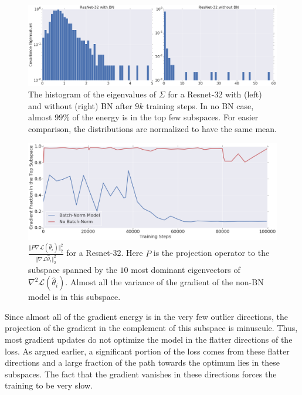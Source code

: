 \documentclass{article}
\newcommand{\loss}{\mathcal{L}}
\begin{document}
 
\begin{figure}[h]
\includegraphics[width=\textwidth]{Covariance_Eigenvalues_Normalized.png}
\vspace{-0.5cm}
\caption{The histogram of the eigenvalues of $\Sigma$ for a Resnet-32 with (left) and without (right) BN after $9k$ training steps. In no BN case, almost $99\%$ of the energy is in the top few subspaces. For easier comparison, the distributions are normalized to have the same mean. \label{fig:covariance}}
\end{figure}

\begin{figure}[h]
\includegraphics[width=\textwidth]{Gradient_Fraction.png}
\vspace{-0.5cm}
\caption{$\frac{\Vert P \nabla \loss(\hat{\theta}_i) \Vert_2^2}{\Vert \nabla \loss\hat{\theta}_i \Vert_2^2}$ for a Resnet-32. Here $P$ is the projection operator to the subspace spanned by the $10$ most dominant eigenvectors of $\nabla^2 \loss (\hat{\theta}_i)$. Almost all the variance of the gradient of the non-BN model is in this subspace. \label{fig:gradient_figure}}
\end{figure}


Since almost all of the gradient energy is in the very few outlier directions, the projection of the gradient in the complement of this subspace is minuscule. Thus, most gradient updates do not optimize the model in the flatter directions of the loss. As argued earlier, a significant portion of the loss comes from these flatter directions and a large fraction of the path towards the optimum lies in these subspaces. The fact that the gradient vanishes in these directions forces the training to be very slow. 
\end{document}
